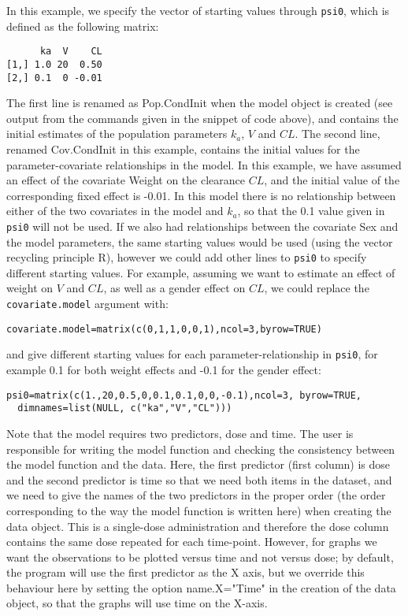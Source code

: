 In this example, we specify the vector of starting values through \texttt{psi0}, which is defined as the following matrix:
\begin{verbatim}
      ka  V    CL
[1,] 1.0 20  0.50
[2,] 0.1  0 -0.01
\end{verbatim}
The first line is renamed as Pop.CondInit when the model object is created (see output from the commands given in the snippet of code above), and contains the initial estimates of the population parameters $k_a$, $V$ and $CL$. The second line, renamed Cov.CondInit in this example, contains the initial values for the parameter-covariate relationships in the model. In this example, we have assumed an effect of the covariate Weight on the clearance $CL$, and the initial value of the corresponding fixed effect is -0.01. In this model there is no relationship between either of the two covariates in the model and $k_a$, so that the 0.1 value given in \texttt{psi0} will not be used. If we also had relationships between the covariate Sex and the model parameters, the same starting values would be used (using the vector recycling principle {\sf R}), however we could add other lines to \texttt{psi0} to specify different starting values. For example, assuming we want to estimate an effect of weight on $V$ and $CL$, as well as a gender effect on $CL$, we could replace the \texttt{covariate.model} argument with:
\begin{verbatim}
covariate.model=matrix(c(0,1,1,0,0,1),ncol=3,byrow=TRUE)
\end{verbatim}
and give different starting values for each parameter-relationship in \texttt{psi0}, for example 0.1 for both weight effects and -0.1 for the gender effect:
\begin{verbatim}
psi0=matrix(c(1.,20,0.5,0,0.1,0.1,0,0,-0.1),ncol=3, byrow=TRUE,
  dimnames=list(NULL, c("ka","V","CL")))
\end{verbatim}

Note that the model requires two predictors, dose and time. The user is responsible for writing the model function and checking the consistency between the model function and the data. Here, the first predictor (first column) is dose and the second predictor is time so that we need both items in the dataset, and we need to give the names of the two predictors in the proper order (the order corresponding to the way the model function is written here) when creating the data object. This is a single-dose administration and therefore the dose column contains the same dose repeated for each time-point. However, for graphs we want the observations to be plotted versus time and not versus dose; by default, the program will use the first predictor as the X axis, but we override this behaviour here by setting the option {\sf name.X="Time"} in the creation of the data object, so that the graphs will use time on the X-axis.

